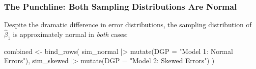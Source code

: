 \documentclass[
  letterpaper,
  DIV=11,
  numbers=noendperiod]{scrreprt}
\newenvironment{Shaded}{\begin{snugshade}}{\end{snugshade}}
\newcommand{\AttributeTok}[1]{\textcolor[rgb]{0.40,0.45,0.13}{#1}}
\newcommand{\FunctionTok}[1]{\textcolor[rgb]{0.28,0.35,0.67}{#1}}
\newcommand{\NormalTok}[1]{\textcolor[rgb]{0.00,0.23,0.31}{#1}}
\newcommand{\OtherTok}[1]{\textcolor[rgb]{0.00,0.23,0.31}{#1}}
\newcommand{\SpecialCharTok}[1]{\textcolor[rgb]{0.37,0.37,0.37}{#1}}
\newcommand{\StringTok}[1]{\textcolor[rgb]{0.13,0.47,0.30}{#1}}
\begin{document}
\subsubsection{The Punchline: Both Sampling Distributions Are
Normal}\label{the-punchline-both-sampling-distributions-are-normal}

Despite the dramatic difference in error distributions, the sampling
distribution of \(\hat{\beta}_1\) is approximately normal in \emph{both}
cases:

\begin{Shaded}
\begin{Highlighting}[]
\NormalTok{combined }\OtherTok{\textless{}{-}} \FunctionTok{bind\_rows}\NormalTok{(}
\NormalTok{  sim\_normal }\SpecialCharTok{|\textgreater{}} \FunctionTok{mutate}\NormalTok{(}\AttributeTok{DGP =} \StringTok{"Model 1: Normal Errors"}\NormalTok{),}
\NormalTok{  sim\_skewed }\SpecialCharTok{|\textgreater{}} \FunctionTok{mutate}\NormalTok{(}\AttributeTok{DGP =} \StringTok{"Model 2: Skewed Errors"}\NormalTok{)}
\NormalTok{)}


\end{Highlighting}
\end{Shaded}
\end{document}
